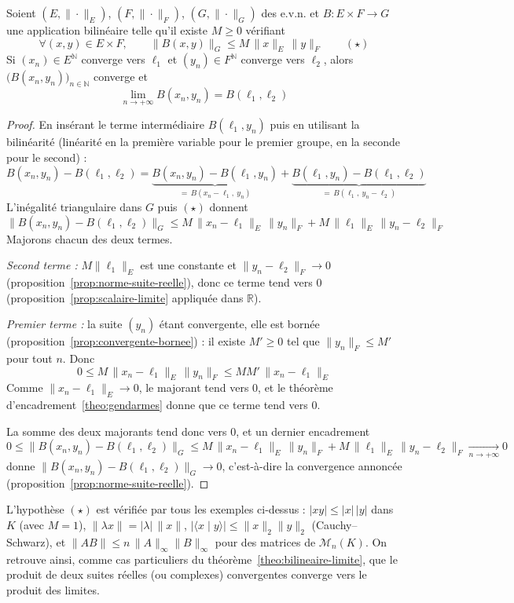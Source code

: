 \begin{theo}
\label{theo:bilineaire-limite}
Soient $(E,\|\cdot\|_E)$, $(F,\|\cdot\|_F)$, $(G,\|\cdot\|_G)$ des e.v.n. et $B:E\times F\to G$ une application bilinéaire telle qu'il existe $M\geq 0$ vérifiant
\[\forall (x,y)\in E\times F,\qquad \|B(x,y)\|_G \leq M\,\|x\|_E\,\|y\|_F \qquad (\star)\]
Si $(x_n)\in E^{\mathbb{N}}$ converge vers $\ell_1$ et $(y_n)\in F^{\mathbb{N}}$ converge vers $\ell_2$, alors $\big(B(x_n,y_n)\big)_{n\in\mathbb{N}}$ converge et
\[\lim_{n\to+\infty}B(x_n,y_n) = B(\ell_1,\ell_2)\]
\end{theo}

\begin{proof}
En insérant le terme intermédiaire $B(\ell_1,y_n)$ puis en utilisant la bilinéarité (linéarité en la première variable pour le premier groupe, en la seconde pour le second) :
\[B(x_n,y_n)-B(\ell_1,\ell_2) = \underbrace{B(x_n,y_n)-B(\ell_1,y_n)}_{=\,B(x_n-\ell_1,\ y_n)} + \underbrace{B(\ell_1,y_n)-B(\ell_1,\ell_2)}_{=\,B(\ell_1,\ y_n-\ell_2)}\]
L'inégalité triangulaire dans $G$ puis $(\star)$ donnent
\[\big\|B(x_n,y_n)-B(\ell_1,\ell_2)\big\|_G \leq M\,\|x_n-\ell_1\|_E\,\|y_n\|_F + M\,\|\ell_1\|_E\,\|y_n-\ell_2\|_F\]
Majorons chacun des deux termes.

\emph{Second terme :} $M\|\ell_1\|_E$ est une constante et $\|y_n-\ell_2\|_F\to 0$ (proposition~\ref{prop:norme-suite-reelle}), donc ce terme tend vers $0$ (proposition~\ref{prop:scalaire-limite} appliquée dans $\mathbb{R}$).

\emph{Premier terme :} la suite $(y_n)$ étant convergente, elle est bornée (proposition~\ref{prop:convergente-bornee}) : il existe $M'\geq 0$ tel que $\|y_n\|_F\leq M'$ pour tout $n$. Donc
\[0 \leq M\,\|x_n-\ell_1\|_E\,\|y_n\|_F \leq M M'\,\|x_n-\ell_1\|_E\]
Comme $\|x_n-\ell_1\|_E\to 0$, le majorant tend vers $0$, et le théorème d'encadrement~\ref{theo:gendarmes} donne que ce terme tend vers $0$.

La somme des deux majorants tend donc vers $0$, et un dernier encadrement
\[0 \leq \big\|B(x_n,y_n)-B(\ell_1,\ell_2)\big\|_G \leq M\,\|x_n-\ell_1\|_E\,\|y_n\|_F + M\,\|\ell_1\|_E\,\|y_n-\ell_2\|_F \xrightarrow[n\to+\infty]{} 0\]
donne $\big\|B(x_n,y_n)-B(\ell_1,\ell_2)\big\|_G\to 0$, c'est-à-dire la convergence annoncée (proposition~\ref{prop:norme-suite-reelle}).
\end{proof}

\begin{remarque}
L'hypothèse $(\star)$ est vérifiée par tous les exemples ci-dessus : $|xy|\leq|x|\,|y|$ dans $K$ (avec $M=1$), $\|\lambda x\|=|\lambda|\,\|x\|$, $|\langle x\mid y\rangle|\leq\|x\|_2\|y\|_2$ (Cauchy--Schwarz), et $\|AB\|\leq n\,\|A\|_\infty\|B\|_\infty$ pour des matrices de $\mathcal{M}_n(K)$. On retrouve ainsi, comme cas particuliers du théorème~\ref{theo:bilineaire-limite}, que le produit de deux suites réelles (ou complexes) convergentes converge vers le produit des limites.
\end{remarque}

